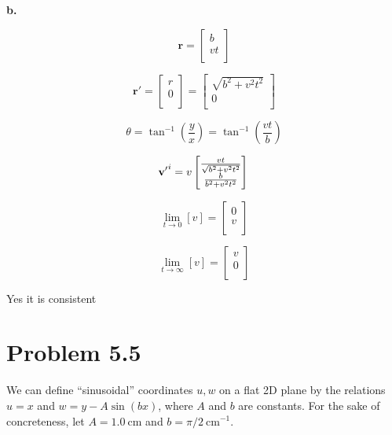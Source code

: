 \documentclass[12pt]{article}
\begin{document}
\textbf{b.}

\[
      \mathbf{r} =
      \begin{bmatrix}
            b  \\
            vt \\
      \end{bmatrix}
\]

\[
      \mathbf{r}' =
      \begin{bmatrix}
            r \\
            0 \\
      \end{bmatrix} = \begin{bmatrix}
            \sqrt{b^2+v^2t^2} \\
            0                 \\
      \end{bmatrix}
\]

\[
      \theta = \tan^{-1}{(\frac{y}{x})} = \tan^{-1}{(\frac{vt}{b})}
\]

\[
      {\mathbf{v}'}^i
      = v
      \begin{bmatrix}
            \frac{vt}{\sqrt{b^2+v^2t^2}} \\
            \frac{b}{b^2+v^2t^2}         \\
      \end{bmatrix} \\
\]

\[
      \lim_{t \rightarrow 0}[v] = \begin{bmatrix}
            0 \\
            v \\
      \end{bmatrix}
\]

\[
      \lim_{t \rightarrow \infty}[v] = \begin{bmatrix}
            v \\
            0 \\
      \end{bmatrix}
\]

Yes it is consistent

\newpage

\section{Problem 5.5}

We can define ``sinusoidal'' coordinates \(u, w\) on a flat 2D plane by the relations \(u=x\) and \(w=y-A \sin (b x)\), where \(A\) and \(b\) are constants. For the sake of concreteness, let \(A=1.0 \mathrm{~cm}\) and \(b=\pi / 2 \mathrm{~cm}^{-1}\).
\end{document}
